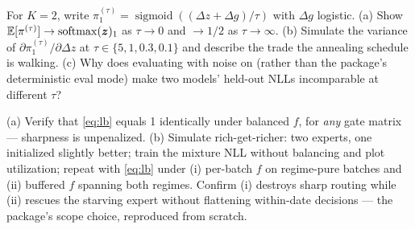 \begin{exercise}\label{ex:6-tau}
For $K = 2$, write $\pi^{(\tau)}_1 = \operatorname{sigmoid}((\Delta z +
\Delta g)/\tau)$ with $\Delta g$ logistic. (a) Show
$\mathbb{E}[\pi^{(\tau)}] \to \operatorname{softmax}(\bm{z})_1$ as $\tau \to 0$ and
$\to 1/2$ as $\tau \to \infty$. (b) Simulate the variance of
$\partial \pi^{(\tau)}_1 / \partial \Delta z$ at
$\tau \in \{5, 1, 0.3, 0.1\}$ and describe the trade the annealing
schedule is walking. (c) Why does evaluating with noise on (rather than
the package's deterministic eval mode) make two models' held-out NLLs
incomparable at different $\tau$?
\end{exercise}

\begin{exercise}\label{ex:6-lb}
(a) Verify that \eqref{eq:lb} equals 1 identically under balanced $f$,
for \emph{any} gate matrix --- sharpness is unpenalized. (b) Simulate
rich-get-richer: two experts, one initialized slightly better; train the
mixture NLL without balancing and plot utilization; repeat with
\eqref{eq:lb} under (i) per-batch $f$ on regime-pure batches and (ii)
buffered $f$ spanning both regimes. Confirm (i) destroys sharp routing
while (ii) rescues the starving expert without flattening within-date
decisions --- the package's scope choice, reproduced from scratch.
\end{exercise}

